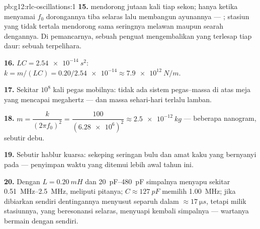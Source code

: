 \begin{solution}{pb:g12:rlc-oscillations:1}
\textbf{15.}  mendorong jutaan kali tiap sekon; hanya ketika
 menyamai $f_0$ dorongannya tiba selaras lalu membangun
ayunannya --- ; stasiun yang tidak tertala mendorong sama seringnya melawan maupun
searah dengannya. Di pemancarnya, sebuah penguat mengembalikan  yang terlesap
tiap daur: sebuah  terpelihara.

\textbf{16.} $LC = \qty{2.54e-14}{s^2}$: $k = m/(LC) =
0.20/\num{2.54e-14} \approx \qty{7.9e12}{N/m}$.

\textbf{17.} Sekitar $10^8$ kali pegas mobilnya: tidak ada sistem
pegas--massa di atas meja yang mencapai megahertz ---  dan massa
sehari-hari terlalu lamban.

\textbf{18.} $m = \dfrac{k}{(2\pi f_0)^2} = \dfrac{100}
{(\num{6.28e6})^2} \approx \qty{2.5e-12}{kg}$ --- beberapa nanogram, sebutir
debu.

\textbf{19.} Sebutir hablur kuarsa: sekeping seringan bulu dan amat kaku
yang bernyanyi pada  --- penyimpan waktu yang ditemui lebih awal
tahun ini.

\textbf{20.} Dengan $L = \qty{0.20}{mH}$ dan \qtyrange{20}{480}{pF}
simpalnya menyapu sekitar \qtyrange{0.51}{2.5}{MHz}, meliputi pitanya;
$C \approx \qty{127}{pF}$ memilih \qty{1.00}{MHz}; jika dibiarkan sendiri dentingannya
menyusut separuh dalam $\approx \qty{17}{\micro s}$, tetapi  milik stasiunnya,
yang beresonansi selaras, menyuapi kembali simpalnya --- wartanya bermain dengan 
 sendiri.
\end{solution}
